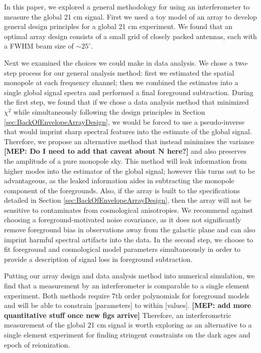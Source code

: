 \documentclass[twolcolumn,apj,iop,numberedappendix]{emulateapj}
\newcommand{\N}{\mathbf{N}}
\newcommand{\mep}[1]{{\color{applegreen} \textbf{[MEP:  #1]}}}
\begin{document}
In this paper, we explored a general methodology for using an interferometer to measure the global 21 cm signal. First we used a toy model of an array to develop general design principles for a global 21 cm experiment. We found that an optimal array design consists of a small grid of closely packed antennas, each with a FWHM beam size of $\sim25^\circ$. 

Next we examined the choices we could make in data analysis. We chose a two-step process for our general analysis method: first we estimated the spatial monopole at each frequency channel; then we combined the estimates into a single global signal spectra and performed a final foreground subtraction. During the first step, we found that if we chose a data analysis method that minimized $\chi^2$ while simultaneously following the design principles in Section \ref{sec:BackOfEnvelopeArrayDesign}, we would be forced to use a pseudo-inverse that would imprint sharp spectral features into the estimate of the global signal. Therefore, we propose an alternative method that instead minimizes the variance \mep{Do I need to add that caveat about $\N$ here?} and also preserves the amplitude of a pure monopole sky. This method will leak information from higher modes into the estimator of the global signal; however this turns out to be advantageous, as the leaked information aides in subtracting the monopole component of the foregrounds. Also, if the array is built to the specifications detailed in Section \ref{sec:BackOfEnvelopeArrayDesign}, then the array will not be sensitive to contaminates from cosmological anisotropies. We recommend against choosing a foreground-motivated noise covariance, as it does not significantly remove foreground bias in observations away from the galactic plane and can also imprint harmful spectral artifacts into the data. In the second step, we choose to fit foreground and cosmological model parameters simultaneously in order to provide a description of signal loss in foreground subtraction. 

Putting our array design and data analysis method into numerical simulation, we find that a measurement by an interferometer is comparable to a single element experiment. Both methods require 7th order polynomials for foreground models and will be able to constrain [parameters] to within [values]. \mep{add more quantitative stuff once new figs arrive} Therefore, an interferometric measurement of the global 21 cm signal is worth exploring as an alternative to a single element experiment for finding stringent constraints on the dark ages and epoch of reionization. 
\end{document}
